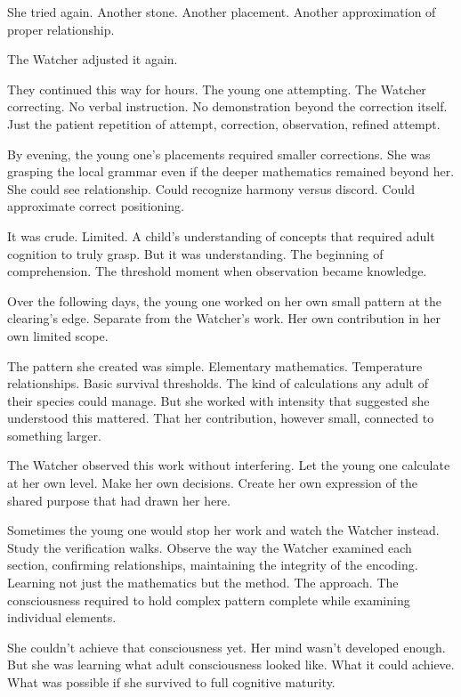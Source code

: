 She tried again. Another stone. Another placement. Another approximation of proper relationship.

The Watcher adjusted it again.

They continued this way for hours. The young one attempting. The Watcher correcting. No verbal instruction. No demonstration beyond the correction itself. Just the patient repetition of attempt, correction, observation, refined attempt.

By evening, the young one's placements required smaller corrections. She was grasping the local grammar even if the deeper mathematics remained beyond her. She could see relationship. Could recognize harmony versus discord. Could approximate correct positioning.

It was crude. Limited. A child's understanding of concepts that required adult cognition to truly grasp. But it was understanding. The beginning of comprehension. The threshold moment when observation became knowledge.

\scenebreak

Over the following days, the young one worked on her own small pattern at the clearing's edge. Separate from the Watcher's work. Her own contribution in her own limited scope.

The pattern she created was simple. Elementary mathematics. Temperature relationships. Basic survival thresholds. The kind of calculations any adult of their species could manage. But she worked with intensity that suggested she understood this mattered. That her contribution, however small, connected to something larger.

The Watcher observed this work without interfering. Let the young one calculate at her own level. Make her own decisions. Create her own expression of the shared purpose that had drawn her here.

Sometimes the young one would stop her work and watch the Watcher instead. Study the verification walks. Observe the way the Watcher examined each section, confirming relationships, maintaining the integrity of the encoding. Learning not just the mathematics but the method. The approach. The consciousness required to hold complex pattern complete while examining individual elements.

She couldn't achieve that consciousness yet. Her mind wasn't developed enough. But she was learning what adult consciousness looked like. What it could achieve. What was possible if she survived to full cognitive maturity.

